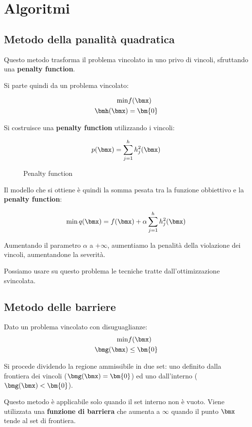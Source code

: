 \documentclass[\main/main.tex]{subfiles}
\begin{document}
\chapter{Algoritmi}
\section{Metodo della panalità quadratica}
Questo metodo trasforma il problema vincolato in uno privo di vincoli, sfruttando una \textbf{penalty function}.

Si parte quindi da un problema vincolato:

\begin{align*}
    \min &f(\bmx)\\
    \bmh(\bmx) &= \bm{0}
\end{align*}

Si costruisce una \textbf{penalty function} utilizzando i vincoli:

\begin{figure}
    \[
        p(\bmx) = \sum_{j=1}^h h_j^2(\bmx)
    \]
    \caption{Penalty function}
\end{figure}

Il modello che si ottiene è quindi la somma pesata tra la funzione obbiettivo e la \textbf{penalty function}:

\[
    \min q(\bmx) = f(\bmx) + \alpha\sum_{j=1}^h h_j^2(\bmx)
\]

Aumentando il parametro \(\alpha \) a \(+\infty \), aumentiamo la penalità della violazione dei vincoli, aumentandone la severità.

Possiamo usare su questo problema le tecniche tratte dall'ottimizzazione svincolata.

\section{Metodo delle barriere}
Dato un problema vincolato con disuguaglianze:
\begin{align*}
    \min &f(\bmx)\\
    \bmg(\bmx) &\leq \bm{0}
\end{align*}

Si procede dividendo la regione ammissibile in due set: uno definito dalla frontiera dei vincoli (\(\bmg(\bmx) = \bm{0}\)) ed uno dall'interno (\(\bmg(\bmx) < \bm{0}\)).

Questo metodo è applicabile solo quando il set interno non è vuoto. Viene utilizzata una \textbf{funzione di barriera} che aumenta a \(\infty \) quando il punto \(\bmx \) tende al set di frontiera.
\end{document}
